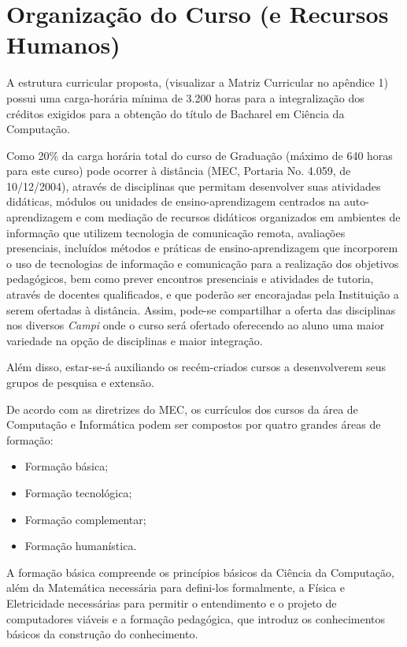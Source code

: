 \documentclass[
	12pt,				%
	openright,			%
  oneside,     %
	a4paper,			%
	english,			%
	french,				%
	spanish,			%
	brazil				%
	]{abntex2}
\begin{document}
%
%

\chapter{Organização do Curso (e Recursos Humanos)}

A estrutura curricular proposta, (visualizar a Matriz Curricular no apêndice 1) possui uma carga-horária mínima de 3.200 horas para a integralização dos créditos exigidos para a obtenção do título de Bacharel em Ciência da Computação.

Como 20\% da carga horária total do curso de Graduação  (máximo de 640 horas para este curso)  pode ocorrer à distância (MEC, Portaria No. 4.059, de 10/12/2004), através de  disciplinas que permitam desenvolver suas atividades didáticas, módulos ou unidades de ensino-aprendizagem centrados na auto-aprendizagem e com mediação de recursos didáticos organizados em ambientes de informação que utilizem tecnologia de comunicação remota, avaliações presenciais, incluídos métodos e práticas de ensino-aprendizagem que incorporem o uso de tecnologias de informação e comunicação para a realização dos objetivos pedagógicos, bem como prever encontros presenciais e atividades de tutoria, através de docentes qualificados, e que poderão ser encorajadas pela Instituição a serem ofertadas à distância. Assim, pode-se compartilhar a oferta das disciplinas nos diversos \textit{Campi} onde o curso será ofertado oferecendo ao aluno uma maior variedade na opção de disciplinas e maior integração. 

Além disso, estar-se-á auxiliando os recém-criados cursos a desenvolverem seus grupos de pesquisa e extensão.

De acordo com as diretrizes do MEC, os currículos dos cursos da área de Computação e Informática podem ser compostos por quatro grandes áreas de formação:

\begin{itemize}
  \item Formação básica;
  \item Formação tecnológica;
  \item Formação complementar;
  \item Formação humanística.
\end{itemize}

A formação básica compreende os princípios básicos da Ciência da Computação, além da Matemática necessária para defini-los formalmente, a Física e Eletricidade necessárias para permitir o entendimento e o projeto de computadores viáveis e a formação pedagógica, que introduz os conhecimentos básicos da construção do conhecimento. 
\end{document}
